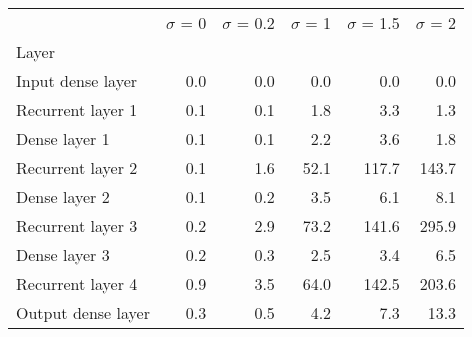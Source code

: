\begin{tabular}{lrrrrr}
\toprule
{} &  $\sigma$  = 0 &  $\sigma$  = 0.2 &  $\sigma$  = 1 &  $\sigma$  = 1.5 &  $\sigma$  = 2 \\
Layer              &                &                  &                &                  &                \\
\midrule
Input dense layer  &            0.0 &              0.0 &            0.0 &              0.0 &            0.0 \\
Recurrent layer 1  &            0.1 &              0.1 &            1.8 &              3.3 &            1.3 \\
Dense layer 1      &            0.1 &              0.1 &            2.2 &              3.6 &            1.8 \\
Recurrent layer 2  &            0.1 &              1.6 &           52.1 &            117.7 &          143.7 \\
Dense layer 2      &            0.1 &              0.2 &            3.5 &              6.1 &            8.1 \\
Recurrent layer 3  &            0.2 &              2.9 &           73.2 &            141.6 &          295.9 \\
Dense layer 3      &            0.2 &              0.3 &            2.5 &              3.4 &            6.5 \\
Recurrent layer 4  &            0.9 &              3.5 &           64.0 &            142.5 &          203.6 \\
Output dense layer &            0.3 &              0.5 &            4.2 &              7.3 &           13.3 \\
\bottomrule
\end{tabular}
